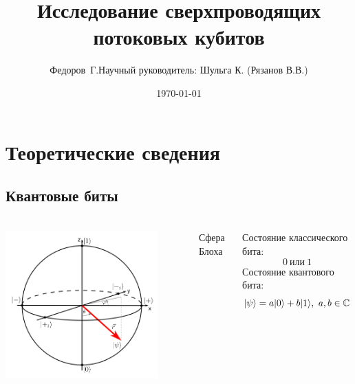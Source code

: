 \documentclass[aspectratio=169, 13pt]{beamer}
\title{Исследование сверхпроводящих потоковых кубитов}
\author{Федоров~Г.\quad Научный руководитель: Шульга К. (Рязанов В.В.)}
\date{\today}
\DeclarePairedDelimiter\ket{\lvert}{\rangle}
\begin{document}
{
\begin{frame}[plain]
  \titlepage
\end{frame}
}

\frame[plain]{\tableofcontents}

\section{Теоретические сведения}
\subsection{Квантовые биты}
\begin{frame}[c]\frametitle{\secname}\framesubtitle{\subsecname}
\begin{columns}[c]
\centering
\includegraphics[width=0.85\textwidth]{bloch_sphere}

Сфера Блоха

Состояние классического бита:
\begin{equation*}
0\ \text{или}\ 1
\end{equation*}
Состояние квантового бита:
\hspace{-2cm}
\begin{equation*}
\ket{\psi} = a\ket{0}+b\ket{1},\ a,b \in \mathbb{C}
\end{equation*}
\end{columns}
\end{frame}
\end{document}
